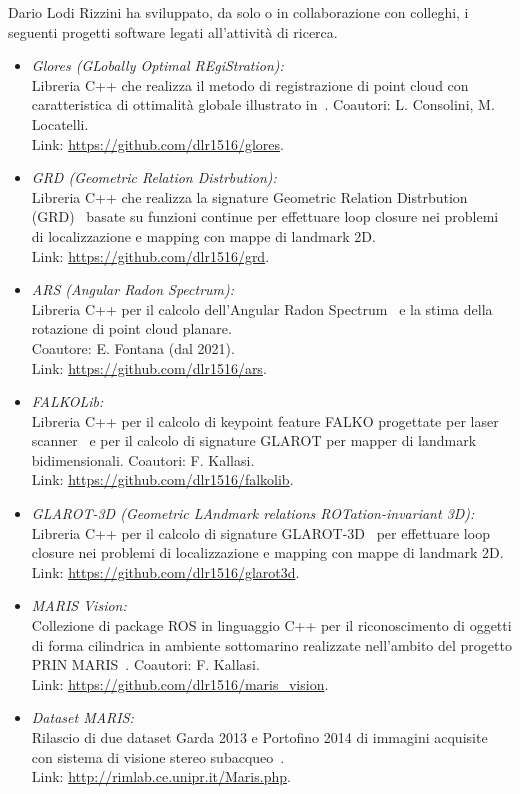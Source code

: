 \documentclass[11pt]{article}
\newcommand{\ITEMDATE}[1]{\item \textit{#1:}\\}
\begin{document}
Dario Lodi Rizzini ha sviluppato, da solo o in collaborazione con colleghi, i seguenti progetti software legati all'attivit\`a di ricerca.
\begin{itemize}
\ITEMDATE{Glores (GLobally Optimal REgiStration)}{
  Libreria C++ che realizza il metodo di registrazione di point cloud con caratteristica di ottimalit\`a globale illustrato in~\cite{consolini2020pr}. 
  Coautori: L. Consolini, M. Locatelli. \\
  Link: \url{https://github.com/dlr1516/glores}.
}
\ITEMDATE{GRD (Geometric Relation Distrbution)}{
  Libreria C++ che realizza la signature Geometric Relation Distrbution (GRD)~\cite{lodirizzini2019ral} basate su funzioni continue per effettuare loop closure nei problemi di localizzazione e mapping con mappe di landmark 2D. \\
  Link: \url{https://github.com/dlr1516/grd}.
}
\ITEMDATE{ARS (Angular Radon Spectrum)}{
  Libreria C++ per il calcolo dell'Angular Radon Spectrum~\cite{lodirizzini2018pr, lodirizzini2022ral} e la stima della rotazione di point cloud planare.\\
  Coautore: E. Fontana (dal 2021). \\
  Link: \url{https://github.com/dlr1516/ars}.
}
\ITEMDATE{FALKOLib}{
  Libreria C++ per il calcolo di keypoint feature FALKO progettate per laser scanner~\cite{kallasi2016ral} e per il calcolo di signature GLAROT per mapper di landmark bidimensionali.
  Coautori: F. Kallasi.\\
  Link: \url{https://github.com/dlr1516/falkolib}.
}
\ITEMDATE{GLAROT-3D (Geometric LAndmark relations ROTation-invariant 3D)}{
  Libreria C++ per il calcolo di signature GLAROT-3D~\cite{lodirizzini2017iros} per effettuare loop closure nei problemi di localizzazione e mapping con mappe di landmark 2D.\\
  Link: \url{https://github.com/dlr1516/glarot3d}.
}
\ITEMDATE{MARIS Vision}{
  Collezione di package ROS in linguaggio C++ per il riconoscimento di oggetti di forma cilindrica in ambiente sottomarino realizzate nell'ambito del progetto PRIN MARIS~\cite{lodirizzini2017caee, simetti2018joe}.
  Coautori: F. Kallasi.\\
  Link: \url{https://github.com/dlr1516/maris\_vision}.
}
\ITEMDATE{Dataset MARIS}{ 
  Rilascio di due dataset Garda 2013 e Portofino 2014 di immagini acquisite con sistema di visione stereo subacqueo~\cite{oleari2015oceans, lodirizzini2015ijars, oleari2014ifac}. \\
  Link: \url{http://rimlab.ce.unipr.it/Maris.php}.
}
\end{itemize}
\end{document}
